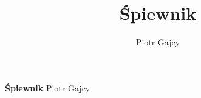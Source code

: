 \documentclass{article}
\title{Śpiewnik}
\author{Piotr Gajcy}
\begin{document}
  
\begin{titlepage}
   \begin{center}
		\Huge
       \vspace*{1cm}
       \textbf{Śpiewnik} \newline \newline \newline
       \vspace{0.5cm}
       \Large
        Piotr Gajcy           
       \vspace{1.5cm}

       \vfill

            
            
   \end{center}
\end{titlepage}
  
\newpage

\tableofcontents

\newpage
\end{document}
